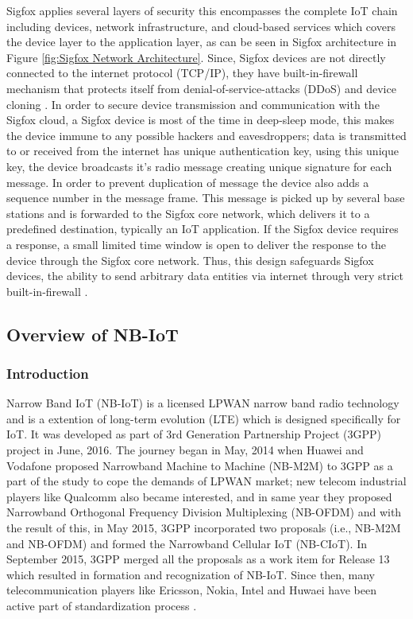 \documentclass[12pt]{article}
\begin{document}
Sigfox applies several layers of security this encompasses the complete IoT chain including devices, network infrastructure, and cloud-based services which covers the device layer to the application layer, as can be seen in Sigfox architecture in Figure \ref{fig:Sigfox Network Architecture}. Since, Sigfox devices are not directly connected to the internet protocol (TCP/IP), they have built-in-firewall mechanism that protects itself from denial-of-service-attacks (DDoS) and device cloning \cite{securitysigfoxwhitepaper}. In order to secure device transmission and communication with the Sigfox cloud, a Sigfox device is most of the time in deep-sleep mode, this makes the device immune to any possible hackers and eavesdroppers;  data is transmitted to or received from the internet has unique authentication key, using this unique key, the device broadcasts it's radio message creating unique signature for each message. In order to prevent duplication of message the device also adds a sequence number in the message frame. This message is picked up by several base stations and is forwarded to the Sigfox core network, which delivers it to a predefined destination, typically an IoT application. If the Sigfox device requires a response, a small limited time window is open to deliver the response to the device through the Sigfox core network. Thus, this design safeguards Sigfox devices, the ability to send arbitrary data entities via internet through very strict built-in-firewall \cite{SigfoxTechnicalDoc,securitysigfoxwhitepaper}.


\subsection{Overview of NB-IoT}\label{Overview of NB-IoT}

\subsubsection{Introduction}
Narrow Band IoT (NB-IoT) is a licensed LPWAN narrow band radio technology and is a extention of long-term evolution (LTE) which is designed specifically for IoT. It was developed as part of 3rd Generation Partnership Project (3GPP) project in June, 2016. The journey began in May, 2014 when Huawei and Vodafone proposed Narrowband Machine to Machine (NB-M2M) to 3GPP as a part of the study to cope the demands of LPWAN market; new telecom industrial players like Qualcomm also became interested, and in same year they proposed Narrowband Orthogonal Frequency Division Multiplexing (NB-OFDM) and with the result of this, in May 2015, 3GPP incorporated two proposals (i.e., NB-M2M and NB-OFDM) and formed the Narrowband Cellular IoT (NB-CIoT). In September 2015, 3GPP merged all the proposals as a work item for Release 13 which resulted in formation and recognization of NB-IoT. Since then, many telecommunication players like Ericsson, Nokia, Intel and Huwaei have been active part of standardization process \cite{malik2018radio,5GUK,mwakwata2019narrowband}.
\end{document}
